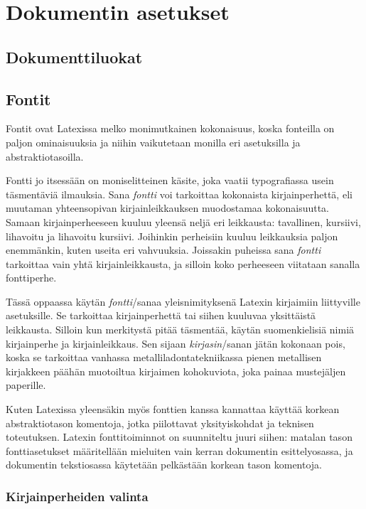 \chapter{Dokumentin asetukset}
\section{Dokumenttiluokat}
\label{luku:dokumenttiluokat}
\section{Fontit}
\label{luku:kirjaintyypit}

Fontit ovat Latexissa melko monimutkainen kokonaisuus, koska fonteilla
on paljon ominaisuuksia ja niihin vaikutetaan monilla eri asetuksilla ja
abstraktiotasoilla.

Fontti jo itsessään on moniselitteinen käsite, joka vaatii
typo\-gra\-fias\-sa usein täsmentäviä ilmauksia. Sana \emph{fontti} voi
tarkoittaa kokonaista kirjainperhettä, eli muutaman yhteensopivan
kirjainleikkauksen muodostamaa kokonaisuutta. Samaan kirjainperheeseen
kuuluu yleensä neljä eri leikkausta: tavallinen, kursiivi, lihavoitu ja
lihavoitu kursiivi. Joihinkin perheisiin kuuluu leikkauksia paljon
enemmänkin, kuten useita eri vahvuuksia. Joissakin puheissa sana
\emph{fontti} tarkoittaa vain yhtä kirjainleikkausta, ja silloin koko
perheeseen viitataan sanalla fonttiperhe.

Tässä oppaassa käytän \emph{fontti}\-/sanaa yleisnimityksenä Latexin
kirjaimiin liittyville asetuksille. Se tarkoittaa kirjainperhettä tai
siihen kuuluvaa yksittäistä leikkausta. Silloin kun merkitystä pitää
täsmentää, käytän suomenkielisiä nimiä kirjainperhe ja kirjainleikkaus.
Sen sijaan \emph{kirjasin}\-/sanan jätän kokonaan pois, koska se
tarkoittaa vanhassa metalliladontatekniikassa pienen metallisen
kirjakkeen päähän muotoiltua kirjaimen kohokuviota, joka painaa
mustejäljen paperille.

Kuten Latexissa yleensäkin myös fonttien kanssa kannattaa käyttää
korkean abstraktiotason komentoja, jotka piilottavat yksityiskohdat ja
teknisen toteutuksen. Latexin fonttitoiminnot on suunniteltu juuri
siihen: matalan tason fontti\-asetukset määritellään mieluiten vain
kerran dokumentin esittely\-osassa, ja dokumentin teksti\-osassa
käytetään pelkästään korkean tason komentoja.

\subsection{Kirjainperheiden valinta}

